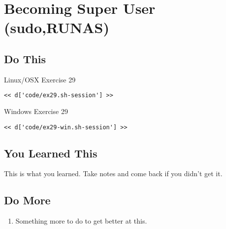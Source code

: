 \chapter{Becoming Super User (sudo,RUNAS)}

\section{Do This}

\begin{code}{Linux/OSX Exercise 29}
\begin{Verbatim}
<< d['code/ex29.sh-session'] >>
\end{Verbatim}
\end{code}

\begin{code}{Windows Exercise 29}
\begin{Verbatim}
<< d['code/ex29-win.sh-session'] >>
\end{Verbatim}
\end{code}

\section{You Learned This}

This is what you learned.  Take notes and come back if you didn't get it.

\section{Do More}

\begin{enumerate}
\item Something more to do to get better at this.
\end{enumerate}

